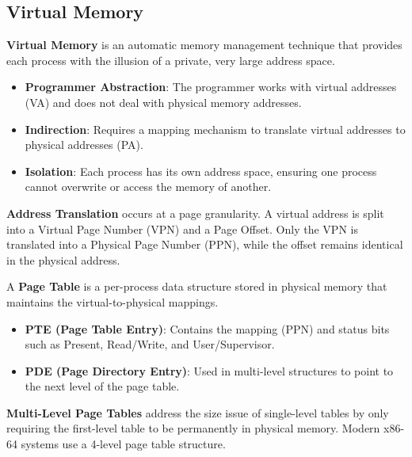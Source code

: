 \subsection{Virtual Memory}

\begin{definition}
	\textbf{Virtual Memory} is an automatic memory management technique that provides each process with the illusion of a private, very large address space.
	\begin{itemize}
		\item \textbf{Programmer Abstraction}: The programmer works with virtual addresses (VA) and does not deal with physical memory addresses.
		\item \textbf{Indirection}: Requires a mapping mechanism to translate virtual addresses to physical addresses (PA).
		\item \textbf{Isolation}: Each process has its own address space, ensuring one process cannot overwrite or access the memory of another.
	\end{itemize}
\end{definition}

\begin{lemma}
	\textbf{Address Translation} occurs at a page granularity. A virtual address is split into a Virtual Page Number (VPN) and a Page Offset. Only the VPN is translated into a Physical Page Number (PPN), while the offset remains identical in the physical address.
\end{lemma}

\begin{definition}
	A \textbf{Page Table} is a per-process data structure stored in physical memory that maintains the virtual-to-physical mappings.
	\begin{itemize}
		\item \textbf{PTE (Page Table Entry)}: Contains the mapping (PPN) and status bits such as Present, Read/Write, and User/Supervisor.
		\item \textbf{PDE (Page Directory Entry)}: Used in multi-level structures to point to the next level of the page table.
	\end{itemize}
\end{definition}

\begin{remark}
	\textbf{Multi-Level Page Tables} address the size issue of single-level tables by only requiring the first-level table to be permanently in physical memory. Modern x86-64 systems use a 4-level page table structure.
\end{remark}

